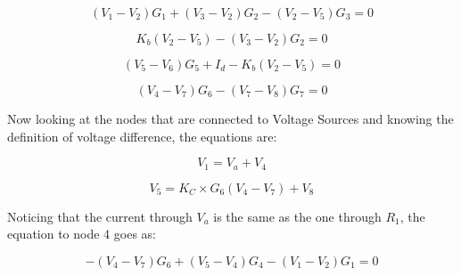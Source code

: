 \begin{equation}
  (V_1-V_2)G_1 + (V_3-V_2)G_2 - (V_2-V_5)G_3 = 0
  \label{eq:Node2}
\end{equation}

\begin{equation}
  K_b(V_2-V_5) - (V_3-V_2)G_2 = 0
  \label{eq:Node3}
\end{equation}

\begin{equation}
  (V_5-V_6)G_5 + I_d - K_b(V_2-V_5) = 0
  \label{eq:Node6}
\end{equation}

\begin{equation}
  (V_4-V_7)G_6 - (V_7-V_8)G_7 = 0
  \label{eq:Node7}
\end{equation}

Now looking at the nodes that are connected to Voltage Sources and knowing the definition of voltage difference, the equations are:

\begin{equation}
  V_1 = V_a + V_4
  \label{eq:Node1}
\end{equation}

\begin{equation}
  V_5= K_C \times G_6(V_4-V_7) + V_8
  \label{eq:Node5}
\end{equation}

Noticing that the current through $V_a$ is the same as the one through $R_1$, the equation to node 4 goes as:

\begin{equation}
  -(V_4-V_7)G_6 + (V_5-V_4)G_4 - (V_1-V_2)G_1 = 0
  \label{eq:Node5}
\end{equation}

